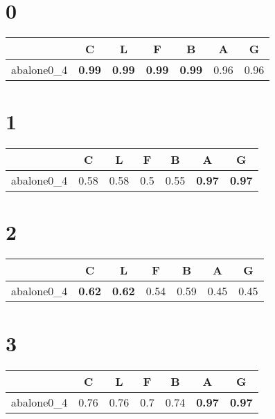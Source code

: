 \documentclass{article}%
\begin{document}
%
\normalsize%
\section*{0}%
\begin{tabular}{ccccccc}%
\hline%
&C&L&F&B&A&G\\%
\hline%
abalone0\_4&\textbf{0.99}&\textbf{0.99}&\textbf{0.99}&\textbf{0.99}&0.96&0.96\\%
\hline%
\end{tabular}

%
\section*{1}%
\begin{tabular}{ccccccc}%
\hline%
&C&L&F&B&A&G\\%
\hline%
abalone0\_4&0.58&0.58&0.5&0.55&\textbf{0.97}&\textbf{0.97}\\%
\hline%
\end{tabular}

%
\section*{2}%
\begin{tabular}{ccccccc}%
\hline%
&C&L&F&B&A&G\\%
\hline%
abalone0\_4&\textbf{0.62}&\textbf{0.62}&0.54&0.59&0.45&0.45\\%
\hline%
\end{tabular}

%
\section*{3}%
\begin{tabular}{ccccccc}%
\hline%
&C&L&F&B&A&G\\%
\hline%
abalone0\_4&0.76&0.76&0.7&0.74&\textbf{0.97}&\textbf{0.97}\\%
\hline%
\end{tabular}

%
\end{document}
